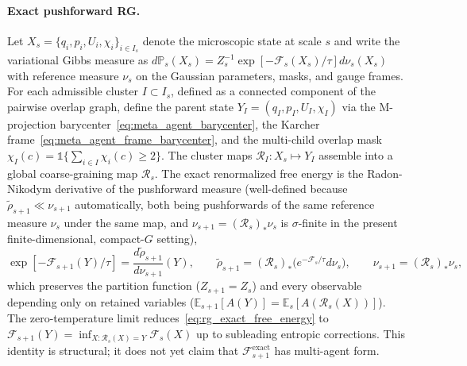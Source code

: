 \documentclass[11pt]{article}
\begin{document}
\paragraph{Exact pushforward RG.}
Let $X_s = \{q_i, p_i, U_i, \chi_i\}_{i \in I_s}$ denote the microscopic state at scale $s$ and write the variational Gibbs measure as $d\mathbb{P}_s(X_s) = Z_s^{-1} \exp[-\mathcal{F}_s(X_s)/\tau] d\nu_s(X_s)$ with reference measure $\nu_s$ on the Gaussian parameters, masks, and gauge frames. For each admissible cluster $I \subset I_s$, defined as a connected component of the pairwise overlap graph, define the parent state $Y_I = (q_I, p_I, U_I, \chi_I)$ via the M-projection barycenter~\eqref{eq:meta_agent_barycenter}, the Karcher frame~\eqref{eq:meta_agent_frame_barycenter}, and the multi-child overlap mask $\chi_I(c) = \mathbb{1}\{\sum_{i \in I}\chi_i(c) \ge 2\}$. The cluster maps $\mathcal{R}_I : X_s \mapsto Y_I$ assemble into a global coarse-graining map $\mathcal{R}_s$. The exact renormalized free energy is the Radon-Nikodym derivative of the pushforward measure (well-defined because $\widetilde{\rho}_{s+1} \ll \nu_{s+1}$ automatically, both being pushforwards of the same reference measure $\nu_s$ under the same map, and $\nu_{s+1} = (\mathcal{R}_s)_*\nu_s$ is $\sigma$-finite in the present finite-dimensional, compact-$G$ setting),
\begin{equation}
\exp[-\mathcal{F}_{s+1}(Y)/\tau] = \frac{d\widetilde{\rho}_{s+1}}{d\nu_{s+1}}(Y), \qquad \widetilde{\rho}_{s+1} = (\mathcal{R}_s)_*\big(e^{-\mathcal{F}_s/\tau} d\nu_s\big), \qquad \nu_{s+1} = (\mathcal{R}_s)_*\nu_s,
\label{eq:rg_exact_free_energy}
\end{equation}
which preserves the partition function ($Z_{s+1} = Z_s$) and every observable depending only on retained variables ($\mathbb{E}_{s+1}[A(Y)] = \mathbb{E}_s[A(\mathcal{R}_s(X))]$). The zero-temperature limit reduces~\eqref{eq:rg_exact_free_energy} to $\mathcal{F}_{s+1}(Y) = \inf_{X : \mathcal{R}_s(X) = Y} \mathcal{F}_s(X)$ up to subleading entropic corrections. This identity is structural; it does not yet claim that $\mathcal{F}^{\mathrm{exact}}_{s+1}$ has multi-agent form.
\end{document}
